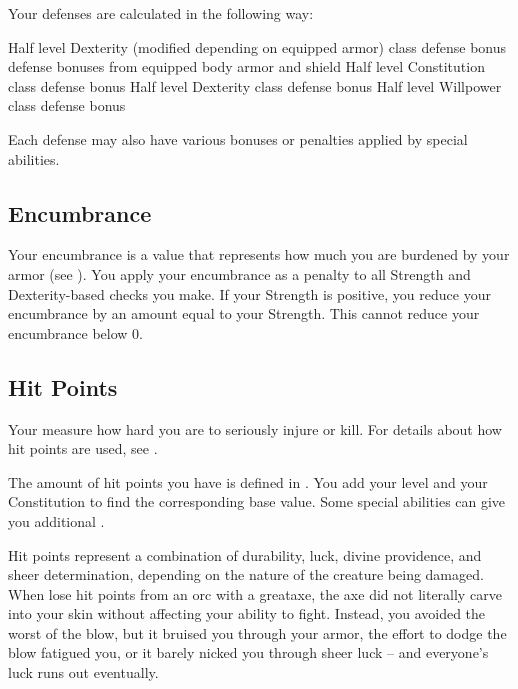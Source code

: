         Your defenses are calculated in the following way:
        \begin{itemize}
             Half level \add Dexterity (modified depending on equipped armor) \add class defense bonus \add defense bonuses from equipped body armor and shield
             Half level \add Constitution \add class defense bonus
             Half level \add Dexterity \add class defense bonus
             Half level \add Willpower \add class defense bonus
        \end{itemize}
        Each defense may also have various bonuses or penalties applied by special abilities.

    \subsection{Encumbrance}\label{Encumbrance}
        Your encumbrance is a value that represents how much you are burdened by your armor (see ).
        You apply your encumbrance as a penalty to all Strength and Dexterity-based checks you make.
        If your Strength is positive, you reduce your encumbrance by an amount equal to your Strength.
        This cannot reduce your encumbrance below 0.

    \subsection{Hit Points}\label{Hit Points}
        Your  measure how hard you are to seriously injure or kill.
        For details about how hit points are used, see .

        The amount of hit points you have is defined in .
        You add your level and your Constitution to find the corresponding base value.
        Some special abilities can give you additional .

         Hit points represent a combination of durability, luck, divine providence, and sheer determination, depending on the nature of the creature being damaged.
        When lose hit points from an orc with a greataxe, the axe did not literally carve into your skin without affecting your ability to fight.
        Instead, you avoided the worst of the blow, but it bruised you through your armor, the effort to dodge the blow fatigued you, or it barely nicked you through sheer luck -- and everyone's luck runs out eventually.

